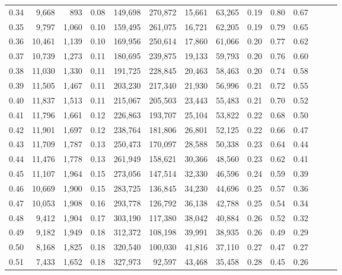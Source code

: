 \begin{tabular}{rrrrrrrrrrrrrr}
0.34 &   9,668 &    893 &  0.08 &  149,698 &  270,872 &  15,661 &  63,265 &  0.19 &  0.80 &      0.67 \\
0.35 &   9,797 &  1,060 &  0.10 &  159,495 &  261,075 &  16,721 &  62,205 &  0.19 &  0.79 &      0.65 \\
0.36 &  10,461 &  1,139 &  0.10 &  169,956 &  250,614 &  17,860 &  61,066 &  0.20 &  0.77 &      0.62 \\
0.37 &  10,739 &  1,273 &  0.11 &  180,695 &  239,875 &  19,133 &  59,793 &  0.20 &  0.76 &      0.60 \\
0.38 &  11,030 &  1,330 &  0.11 &  191,725 &  228,845 &  20,463 &  58,463 &  0.20 &  0.74 &      0.58 \\
0.39 &  11,505 &  1,467 &  0.11 &  203,230 &  217,340 &  21,930 &  56,996 &  0.21 &  0.72 &      0.55 \\
0.40 &  11,837 &  1,513 &  0.11 &  215,067 &  205,503 &  23,443 &  55,483 &  0.21 &  0.70 &      0.52 \\
0.41 &  11,796 &  1,661 &  0.12 &  226,863 &  193,707 &  25,104 &  53,822 &  0.22 &  0.68 &      0.50 \\
0.42 &  11,901 &  1,697 &  0.12 &  238,764 &  181,806 &  26,801 &  52,125 &  0.22 &  0.66 &      0.47 \\
0.43 &  11,709 &  1,787 &  0.13 &  250,473 &  170,097 &  28,588 &  50,338 &  0.23 &  0.64 &      0.44 \\
0.44 &  11,476 &  1,778 &  0.13 &  261,949 &  158,621 &  30,366 &  48,560 &  0.23 &  0.62 &      0.41 \\
0.45 &  11,107 &  1,964 &  0.15 &  273,056 &  147,514 &  32,330 &  46,596 &  0.24 &  0.59 &      0.39 \\
0.46 &  10,669 &  1,900 &  0.15 &  283,725 &  136,845 &  34,230 &  44,696 &  0.25 &  0.57 &      0.36 \\
0.47 &  10,053 &  1,908 &  0.16 &  293,778 &  126,792 &  36,138 &  42,788 &  0.25 &  0.54 &      0.34 \\
0.48 &   9,412 &  1,904 &  0.17 &  303,190 &  117,380 &  38,042 &  40,884 &  0.26 &  0.52 &      0.32 \\
0.49 &   9,182 &  1,949 &  0.18 &  312,372 &  108,198 &  39,991 &  38,935 &  0.26 &  0.49 &      0.29 \\
0.50 &   8,168 &  1,825 &  0.18 &  320,540 &  100,030 &  41,816 &  37,110 &  0.27 &  0.47 &      0.27 \\
0.51 &   7,433 &  1,652 &  0.18 &  327,973 &   92,597 &  43,468 &  35,458 &  0.28 &  0.45 &      0.26 \\

\end{tabular}
